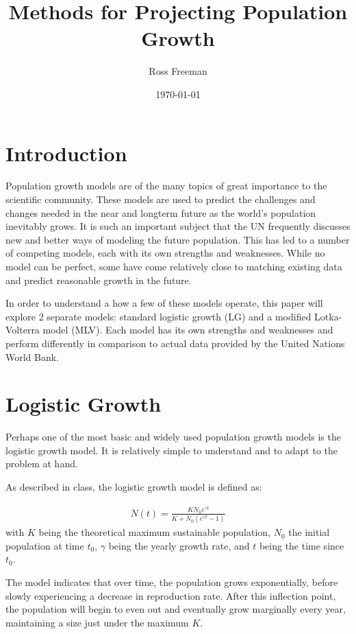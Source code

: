 \documentclass[a4paper]{article}
\begin{document}
\title{Methods for Projecting Population Growth}
\author{Ross Freeman}
\date{\today}
\maketitle
\section{Introduction}

Population growth models are of the many topics of great importance to the scientific community. These models are used to predict the challenges and changes needed in the near and longterm future as the world's population inevitably grows. It is such an important subject that the UN frequently discusses new and better ways of modeling the future population. This has led to a number of competing models, each with its own strengths and weaknesses. While no model can be perfect, some have come relatively close to matching existing data and predict reasonable growth in the future. 

In order to understand a how a few of these models operate, this paper will explore 2 separate models: standard logistic growth (LG) and a modified Lotka-Volterra model (MLV). Each model has its own strengths and weaknesses and perform differently in comparison to actual data provided by the United Nations World Bank.

\section{Logistic Growth}

Perhaps one of the most basic and widely used population growth models is the logistic growth model. It is relatively simple to understand and to adapt to the problem at hand.

As described in class, the logistic growth model is defined as:

\begin{align}
\label{eq:log-growth}
	N(t) = \frac{K N_0 e^{\gamma t}}{K + N_0 (e^{\gamma t} - 1)}
\end{align}
with $K$ being the theoretical maximum sustainable population, $N_0$ the initial population at time $t_0$, $\gamma$ being the yearly growth rate, and $t$ being the time since $t_0$.

The model indicates that over time, the population grows exponentially, before slowly experiencing a decrease in reproduction rate. After this inflection point, the population will begin to even out and eventually grow marginally every year, maintaining a size just under the maximum $K$. 
\end{document}
